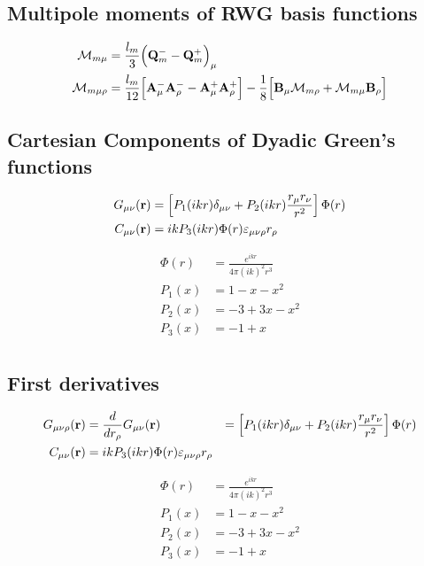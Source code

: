 \documentclass[letterpaper]{article}
\begin{document}
\subsection*{Multipole moments of RWG basis functions}

\begin{align*}
 \mathcal{M}_{m\mu}     
&= \frac{l_m}{3}\Big(\mathbf{Q}^-_m - \mathbf{Q}^+_m\Big)_\mu
\\
 \mathcal{M}_{m\mu\rho} 
&= \frac{l_m}{12}\Big[ \mathbf{A}^-_\mu \mathbf{A}^-_\rho 
                      -\mathbf{A}^+_\mu \mathbf{A}^+_\rho \Big]
  -\frac{1}{8}\Big[ \mathbf{B}_\mu \mathcal{M}_{m\rho} + \mathcal{M}_{m\mu} \mathbf{B}_\rho \Big]
\end{align*}

\subsection*{Cartesian Components of Dyadic Green's functions}

\begin{align*}
  G_{\mu\nu}(\mathbf{r}) 
&= \left[P_1(ikr)\delta_{\mu\nu} + P_2(ikr)\frac{r_\mu r_\nu}{r^2}\right]\Phi(r)
\\
  C_{\mu\nu}(\mathbf{r}) 
&= ik P_3(ikr) \Phi(r) \varepsilon_{\mu\nu\rho} r_\rho
\end{align*}

\begin{align*}
 \Phi(r) &=\frac{e^{ikr}}{4\pi (ik)^2 r^3}
\\
P_1(x)&=1-x-x^2 
\\
P_2(x)&=-3 + 3x - x^2
\\
P_3(x)&=-1+x
\\
\end{align*}

\subsection*{First derivatives}

\begin{align*}
  G_{\mu\nu\rho}(\mathbf{r})
&=\frac{d}{dr_\rho} G_{\mu\nu}(\mathbf{r})
&= \left[P_1(ikr)\delta_{\mu\nu} + P_2(ikr)\frac{r_\mu r_\nu}{r^2}\right]\Phi(r)
\\
  C_{\mu\nu}(\mathbf{r}) 
&= ik P_3(ikr) \Phi(r) \varepsilon_{\mu\nu\rho} r_\rho
\end{align*}

\begin{align*}
 \Phi(r) &=\frac{e^{ikr}}{4\pi (ik)^2 r^3}
\\
P_1(x)&=1-x-x^2 
\\
P_2(x)&=-3 + 3x - x^2
\\
P_3(x)&=-1+x
\\
\end{align*}
\end{document}

